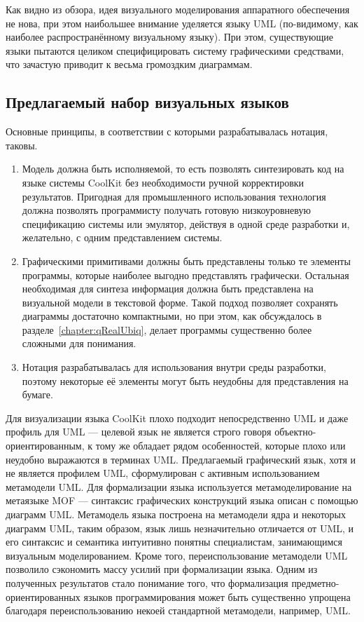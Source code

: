 Как видно из обзора, идея визуального моделирования аппаратного обеспечения не нова, 
при этом наибольшее внимание уделяется языку UML (по-видимому, как наиболее распространённому 
визуальному языку). При этом, существующие языки пытаются целиком специфицировать 
систему графическими средствами, что зачастую приводит к весьма громоздким диаграммам.

\subsection{Предлагаемый набор визуальных языков}
Основные принципы, в соответствии с которыми разрабатывалась нотация, таковы.
\begin{enumerate}
	\item Модель должна быть исполняемой, то есть позволять синтезировать код на языке 
		системы CoolKit без необходимости ручной корректировки результатов. Пригодная 
		для промышленного использования технология должна позволять программисту получать 
		готовую низкоуровневую спецификацию системы или эмулятор, действуя в одной среде 
		разработки и, желательно, с одним представлением системы.
	\item Графическими примитивами должны быть представлены только те элементы программы, 
		которые наиболее выгодно представлять графически. Остальная необходимая для синтеза 
		информация должна быть представлена на визуальной модели в текстовой форме. Такой 
		подход позволяет сохранять диаграммы достаточно компактными, но при этом, как 
		обсуждалось в разделе~\ref{chapter:qRealUbiq}, делает программы существенно более 
		сложными для понимания.
	\item Нотация разрабатывалась для использования внутри среды разработки, поэтому 
		некоторые её элементы могут быть неудобны для представления на бумаге.
\end{enumerate}

Для визуализации языка CoolKit плохо подходит непосредственно UML и даже профиль для 
UML --- целевой язык не является строго говоря объектно-ориентированным, к тому же 
обладает рядом особенностей, которые плохо или неудобно выражаются в терминах UML. 
Предлагаемый графический язык, хотя и не является профилем UML, сформулирован с активным 
использованием метамодели UML. Для формализации языка используется метамоделирование 
на метаязыке MOF --- синтаксис графических конструкций языка описан с помощью диаграмм UML. 
Метамодель языка построена на метамодели ядра и некоторых диаграмм UML, таким образом, 
язык лишь незначительно отличается от UML, и его синтаксис и семантика интуитивно понятны 
специалистам, занимающимся визуальным моделированием. Кроме того, переиспользование 
метамодели UML позволило сэкономить массу усилий при формализации языка. Одним из 
полученных результатов стало понимание того, что формализация предметно-ориентированных 
языков программирования может быть существенно упрощена благодаря переиспользованию 
некоей стандартной метамодели, например, UML.

